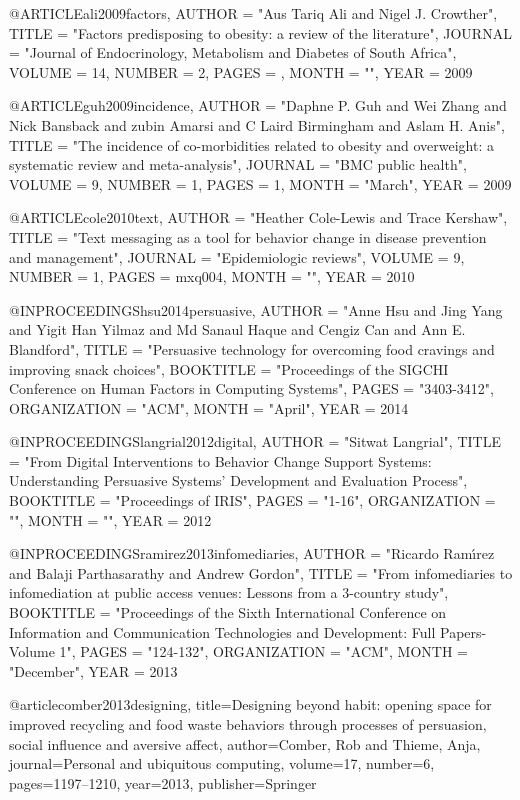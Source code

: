 @ARTICLE{ali2009factors,
	AUTHOR = "Aus Tariq Ali and Nigel J. Crowther",
	TITLE = "Factors predisposing to obesity: a review of the literature",
	JOURNAL = "Journal of Endocrinology, Metabolism and Diabetes of South Africa",
	VOLUME = {14},
	NUMBER = {2},
	PAGES = {},
	MONTH = "",
	YEAR = {2009}	}

@ARTICLE{guh2009incidence,
	AUTHOR = "Daphne P. Guh and Wei Zhang and Nick Bansback and zubin Amarsi and C Laird Birmingham and Aslam H. Anis",
	TITLE = "The incidence of co-morbidities related to obesity and overweight: a systematic review and meta-analysis",
	JOURNAL = "BMC public health",
	VOLUME = {9},
	NUMBER = {1},
	PAGES = {1},
	MONTH = "March",
	YEAR = {2009}	}

@ARTICLE{cole2010text,
	AUTHOR = "Heather Cole-Lewis and Trace Kershaw",
	TITLE = "Text messaging as a tool for behavior change in disease prevention and management",
	JOURNAL = "Epidemiologic reviews",
	VOLUME = {9},
	NUMBER = {1},
	PAGES = {mxq004},
	MONTH = "",
	YEAR = {2010}	}


@INPROCEEDINGS{hsu2014persuasive,
	AUTHOR = "Anne Hsu and Jing Yang and Yigit Han Yilmaz and Md Sanaul Haque and Cengiz Can and  Ann E. Blandford",
	TITLE = "Persuasive technology for overcoming food cravings and improving snack choices",
	BOOKTITLE = "Proceedings of the SIGCHI Conference on Human Factors in Computing Systems",
	PAGES = "3403-3412",
	ORGANIZATION = "ACM",
	MONTH = "April", 
	YEAR = {2014}	}


@INPROCEEDINGS{langrial2012digital,
	AUTHOR = "Sitwat Langrial",
	TITLE = "From Digital Interventions to Behavior Change Support Systems: Understanding Persuasive Systems' Development and Evaluation Process",
	BOOKTITLE = "Proceedings of IRIS",
	PAGES = "1-16",
	ORGANIZATION = "",
	MONTH = "", 
	YEAR = {2012}	}


@INPROCEEDINGS{ramirez2013infomediaries,
	AUTHOR = "Ricardo Ram{\'\i}rez and Balaji Parthasarathy and Andrew Gordon",
	TITLE = "From infomediaries to infomediation at public access venues: Lessons from a 3-country study",
	BOOKTITLE = "Proceedings of the Sixth International Conference on Information and Communication Technologies and Development: Full Papers-Volume 1",
	PAGES = "124-132",
	ORGANIZATION = "ACM",
	MONTH = "December", 
	YEAR = {2013}	}
	
@article{comber2013designing,
  title={Designing beyond habit: opening space for improved recycling and food waste behaviors through processes of persuasion, social influence and aversive affect},
  author={Comber, Rob and Thieme, Anja},
  journal={Personal and ubiquitous computing},
  volume={17},
  number={6},
  pages={1197--1210},
  year={2013},
  publisher={Springer}
}


